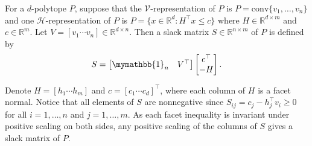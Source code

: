 \documentclass[smallextended, envcountsame]{svjour3}
\begin{document}
    For a $d$-polytope $P$, suppose that the $\mathcal{V}$-representation of $P$ is $P=\mathrm{conv}\{v_1,\ldots,v_n\}$ and one $\mathcal{H}$-representation of $P$ is $P=\{x\in\mathbb{R}^d:H^\top x\le c\}$ where $H\in\mathbb{R}^{d\times m}$ and $c\in\mathbb{R}^m$.  Let $V=[v_1\cdots v_n]\in\mathbb{R}^{d\times n}$.  Then a slack matrix $S\in\mathbb{R}^{n\times m}$ of $P$ is defined by
    \begin{equation*}
        S = \begin{bmatrix}
            \mymathbb{1}_n & V^\top
        \end{bmatrix}\begin{bmatrix}
            c^\top\\
            -H
        \end{bmatrix}.
    \end{equation*}

    Denote $H=[h_1\cdots h_m]$ and $c=[c_1\cdots c_d]^\top$, where each column of $H$ is a facet normal.  Notice that all elements of $S$ are nonnegative since $S_{ij}=c_j-h_j^\top v_i\ge 0$ for all $i=1,\ldots,n$ and $j=1,\ldots,m$.  As each facet inequality is invariant under positive scaling on both sides, any positive scaling of the columns of $S$ gives a slack matrix of $P$.
\end{document}
